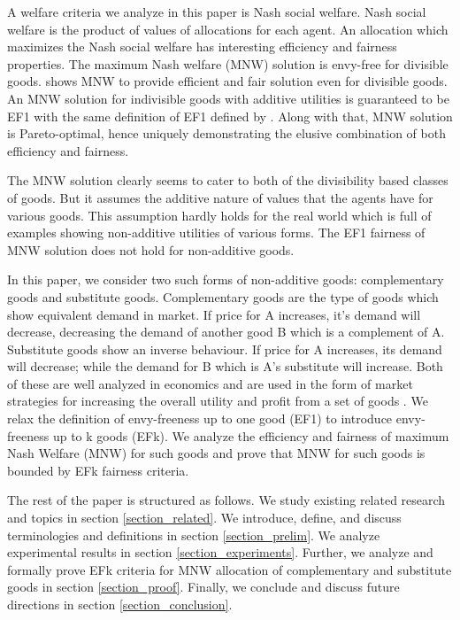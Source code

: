 A welfare criteria we analyze in this paper is Nash social welfare. Nash social welfare is the product of values of allocations for each agent. An allocation which maximizes the Nash social welfare has interesting efficiency and fairness properties. The maximum Nash welfare (MNW) solution is envy-free for divisible goods. \citet{caragiannis2016unreasonable} shows MNW to provide efficient and fair solution even for divisible goods. An MNW solution for indivisible goods with additive utilities is guaranteed to be EF1 \cite{caragiannis2016unreasonable} with the same definition of EF1 defined by \citet{budish2011combinatorial}. Along with that, MNW solution is Pareto-optimal, hence uniquely demonstrating the elusive combination of both efficiency and fairness.

The MNW solution clearly seems to cater to both of the divisibility based classes of goods. But it assumes the additive nature of values that the agents have for various goods. This assumption hardly holds for the real world which is full of examples showing non-additive utilities of various forms. The EF1 fairness of MNW solution does not hold for non-additive goods. 

In this paper, we consider two such forms of non-additive goods: complementary goods and substitute goods. Complementary goods are the type of goods which show equivalent demand in market. If price for A increases, it's demand will decrease, decreasing the demand of another good B which is a complement of A. Substitute goods show an inverse behaviour. If price for A increases, its demand will decrease; while the demand for B which is A's substitute will increase. Both of these are well analyzed in economics and are used in the form of market strategies for increasing the overall utility and profit from a set of goods \cite{lewbel1985bundling, kojima1975international, bulow1985multimarket}. We relax the definition of envy-freeness up to one good (EF1) \cite{budish2011combinatorial} to introduce envy-freeness up to k goods (EFk). We analyze the efficiency and fairness of maximum Nash Welfare (MNW) for such goods and prove that MNW for such goods is bounded by EFk fairness criteria.

The rest of the paper is structured as follows. We study existing related research and topics in section \ref{section_related}. We introduce, define, and discuss terminologies and definitions in section \ref{section_prelim}. We analyze experimental results in section \ref{section_experiments}. Further, we analyze and formally prove EFk criteria for MNW allocation of complementary and substitute goods in section \ref{section_proof}. Finally, we conclude and discuss future directions in section \ref{section_conclusion}.

